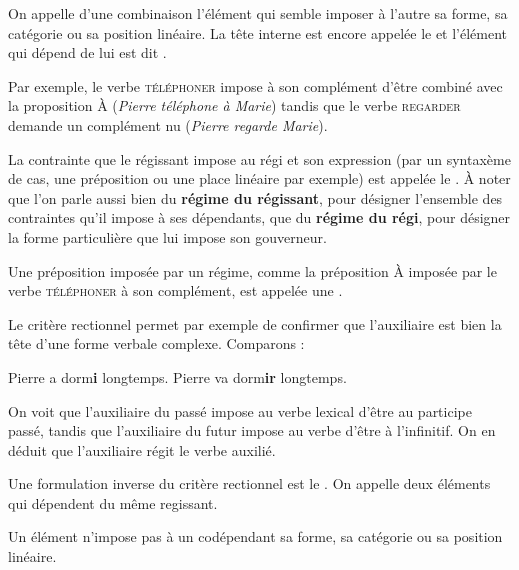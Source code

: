 \begin{styleLivreImportant}
On appelle  d’une combinaison l’élément qui semble imposer à l’autre sa forme, sa catégorie ou sa position linéaire. La tête interne est encore appelée le  et l’élément qui dépend de lui est dit .
\end{styleLivreImportant}

Par exemple, le verbe \textsc{téléphoner} impose à son complément d’être combiné avec la proposition À (\textit{Pierre téléphone à Marie}) tandis que le verbe \textsc{regarder} demande un complément nu (\textit{Pierre regarde Marie}).

\begin{styleLivreImportant}
La contrainte que le régissant impose au régi et son expression (par un syntaxème de cas, une préposition ou une place linéaire par exemple) est appelée le . À noter que l’on parle aussi bien du \textbf{régime du régissant}, pour désigner l’ensemble des contraintes qu’il impose à ses dépendants, que du \textbf{régime du régi}, pour désigner la forme particulière que lui impose son gouverneur.
\end{styleLivreImportant}

Une préposition imposée par un régime, comme la préposition À imposée par le verbe \textsc{téléphoner} à son complément, est appelée une .

Le critère rectionnel permet par exemple de confirmer que l’auxiliaire est bien la tête d’une forme verbale complexe. Comparons :

\ea
{Pierre a dorm}\textbf{{i}}  {longtemps.}
\z
\ea
{Pierre va dorm}\textbf{{ir}}  {longtemps.}
\z

On voit que l’auxiliaire du passé impose au verbe lexical d’être au participe passé, tandis que l’auxiliaire du futur impose au verbe d’être à l’infinitif. On en déduit que l’auxiliaire régit le verbe auxilié.

Une formulation inverse du critère rectionnel est le . On appelle  deux éléments qui dépendent du même regissant.~

\begin{styleLivreImportant}
Un élément n’impose pas à un codépendant sa forme, sa catégorie ou sa position linéaire.
\end{styleLivreImportant}


